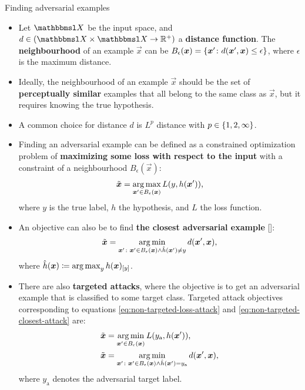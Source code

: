 \documentclass{beamer}
\newcommand{\citep}[1]{{\color{citecolor}\relscale{0.8}[\textcite{#1}]}}
\begin{document}
\begin{frame}[allowframebreaks=0.9]{Finding adversarial examples}
\begin{itemize}
	\item Let $\set X$ be the input space,
	and $d\in(\set X\times\set X\to \R^+)$ a \textbf{distance function}. The \textbf{neighbourhood} of an example $\vec x$ can be $B_{\epsilon}(\vec x) = \cbr{\vec x'\colon d(\vec x', \vec x) \leq \epsilon}$,
	where $\epsilon$ is the maximum distance.
	
	\item Ideally, the neighbourhood of an example $\vec x$ should be the set of \textbf{perceptually similar} examples that all belong to the same class as $\vec x$, but it requires knowing the true hypothesis.
	\item A common choice for distance $d$ is $L^p$ distance with $p\in\cbr{1,2,\infty}$.
	
	\item Finding an adversarial example can be defined as a constrained optimization problem of \textbf{maximizing some loss with respect to the input} with a constraint of a neighbourhood $B_\epsilon(\vec x)$:
	\begin{align}
	\tilde{\vec x} = \argmax_{\vec x'\in B_\epsilon(\vec x)} L(y, h(\vec x')) \text{,} \label{eq:non-targeted-loss-attack}
	\end{align}
	where $y$ is the true label, $h$ the hypothesis, and $L$ the loss function. 
	\item An objective can also be to find \textbf{the closest adversarial example} \citep{Moosavi-Dezfooli:2016:DFSAMFDNN}:
	\begin{align}
	\tilde{\vec x} = \argmin_{\vec x'\colon \vec x'\in B_\epsilon(\vec x) \land \hat{h}(\vec x') \neq y} d(\vec x', \vec x) \text{,} \label{eq:non-targeted-closest-attack}
	\end{align}
	where $\hat{h}(\vec x) \coloneqq \argmax_{y} h(\vec x)_\ind{y}$.
	\item There are also \textbf{targeted attacks}, where the objective is to get an adversarial example that is classified to some target class. Targeted attack objectives corresponding to equations \eqref{eq:non-targeted-loss-attack} and \eqref{eq:non-targeted-closest-attack} are:
	\begin{align}
	\tilde{\vec x} &= \argmin_{\vec x'\in B_\epsilon(\vec x)} L(y_\text{a}, h(\vec x')) \text{,} \label{eq:targeted-loss-attack} \\
	\tilde{\vec x} &= \argmin_{\vec x'\colon \vec x'\in B_\epsilon(\vec x) \land \hat{h}(\vec x') = y_\text{a}} d(\vec x', \vec x) \text{,} \label{eq:targeted-closest-attack}
	\end{align}
	where $y_\text{a}$ denotes the adversarial target label. 
\end{itemize}
\end{frame}
\end{document}
